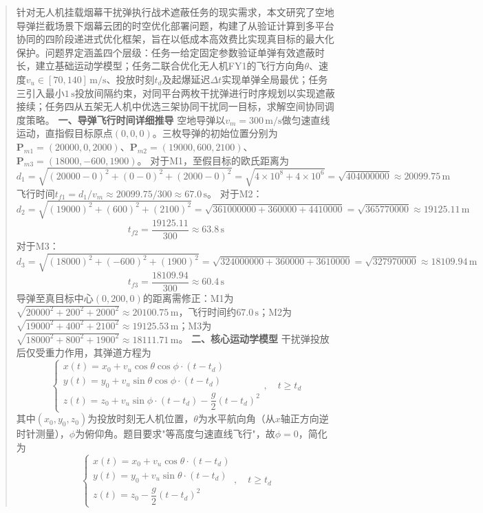 \documentclass{JXUSTmodeling}
\begin{document}
\begin{abstract}
针对无人机挂载烟幕干扰弹执行战术遮蔽任务的现实需求，本文研究了空地导弹拦截场景下烟幕云团的时空优化部署问题，构建了从验证计算到多平台协同的四阶段递进式优化框架，旨在以低成本高效费比实现真目标的最大化保护。问题界定涵盖四个层级：任务一给定固定参数验证单弹有效遮蔽时长，建立基础运动学模型；任务二联合优化无人机FY1的飞行方向角$\theta$、速度$v_u\in[70,140]\,\text{m/s}$、投放时刻$t_d$及起爆延迟$\Delta t$实现单弹全局最优；任务三引入最小$1\,\text{s}$投放间隔约束，对同平台两枚干扰弹进行时序规划以实现遮蔽接续；任务四从五架无人机中优选三架协同干扰同一目标，求解空间协同调度策略。
\textbf{一、导弹飞行时间详细推导}
空地导弹以$v_m=300\,\text{m/s}$做匀速直线运动，直指假目标原点$(0,0,0)$。三枚导弹的初始位置分别为$\mathbf{P}_{m1}=(20000,0,2000)$、$\mathbf{P}_{m2}=(19000,600,2100)$、$\mathbf{P}_{m3}=(18000,-600,1900)$。
对于M1，至假目标的欧氏距离为
$$d_1 = \sqrt{(20000-0)^2+(0-0)^2+(2000-0)^2} = \sqrt{4\times 10^8+4\times 10^6} = \sqrt{404000000} \approx 20099.75\,\text{m}$$
飞行时间$t_{f1} = d_1/v_m \approx 20099.75/300 \approx 67.0\,\text{s}$。
对于M2：
$$d_2 = \sqrt{(19000)^2+(600)^2+(2100)^2} = \sqrt{361000000+360000+4410000} = \sqrt{365770000} \approx 19125.11\,\text{m}$$
$$t_{f2} = \frac{19125.11}{300} \approx 63.8\,\text{s}$$
对于M3：
$$d_3 = \sqrt{(18000)^2+(-600)^2+(1900)^2} = \sqrt{324000000+360000+3610000} = \sqrt{327970000} \approx 18109.94\,\text{m}$$
$$t_{f3} = \frac{18109.94}{300} \approx 60.4\,\text{s}$$
导弹至真目标中心$(0,200,0)$的距离需修正：M1为$\sqrt{20000^2+200^2+2000^2}\approx 20100.75\,\text{m}$，飞行时间约$67.0\,\text{s}$；M2为$\sqrt{19000^2+400^2+2100^2}\approx 19125.53\,\text{m}$；M3为$\sqrt{18000^2+800^2+1900^2}\approx 18111.71\,\text{m}$。
\textbf{二、核心运动学模型}
干扰弹投放后仅受重力作用，其弹道方程为
\begin{equation}
\begin{cases} x(t) = x_0 + v_u\cos\theta\cos\phi\cdot(t-t_d) \\ y(t) = y_0 + v_u\sin\theta\cos\phi\cdot(t-t_d) \\ z(t) = z_0 + v_u\sin\phi\cdot(t-t_d) - \dfrac{g}{2}(t-t_d)^2 \end{cases}, \quad t \geq t_d \tag{1}
\end{equation}
其中$(x_0,y_0,z_0)$为投放时刻无人机位置，$\theta$为水平航向角（从$x$轴正方向逆时针测量），$\phi$为俯仰角。题目要求"等高度匀速直线飞行"，故$\phi=0$，简化为
\begin{equation}
\begin{cases} x(t) = x_0 + v_u\cos\theta\cdot(t-t_d) \\ y(t) = y_0 + v_u\sin\theta\cdot(t-t_d) \\ z(t) = z_0 - \dfrac{g}{2}(t-t_d)^2 \end{cases}, \quad t \geq t_d \tag{2}

\end{equation}
\end{abstract}
\end{document}
